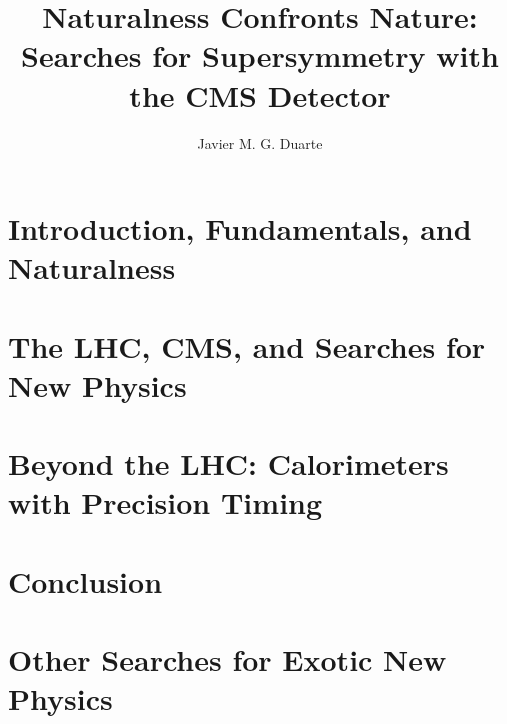 \documentclass[12pt]{caltech_thesis}
\begin{document}
\author{Javier M. G. Duarte}
\title{Naturalness Confronts Nature: Searches for Supersymmetry with
  the CMS Detector}


\address{Pasadena, California}                     %



\maketitle[logo]                  %




\tableofcontents
\listoffigures
\listoftables
\printnomenclature

\mainmatter

\part{Introduction, Fundamentals, and Naturalness}
\label{part:intro}



\part{The LHC, CMS, and Searches for New Physics}
\label{part:searches}





\part{Beyond the LHC: Calorimeters with Precision Timing}
\label{part:timing}

\part{Conclusion}
\label{part:conclusion}


%


\printbibliography[heading=bibintoc]

\printindex
\appendix
\part{Other Searches for Exotic New Physics}
\label{part:app}

\end{document}
